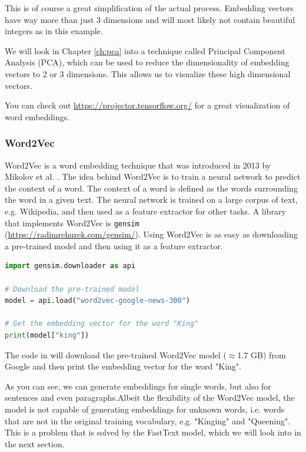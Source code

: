 This is of course a great simplification of the actual process. Embedding vectors have way more than just 3 dimensions and will most likely not contain beautiful integers as in this example.

We will look in Chapter \ref{ch:pca} into a technique called Principal Component Analysis (PCA), which can be used to reduce the dimensionality of embedding vectors to 2 or 3 dimensions. 
This allows us to visualize these high dimensional vectors.

You can check out \url{https://projector.tensorflow.org/} for a great visualization of word embeddings.

\subsubsection{Word2Vec}
Word2Vec is a word embedding technique that was introduced in 2013 by Mikolov et al. \cite{mikolov2013efficient}.
The idea behind Word2Vec is to train a neural network to predict the context of a word.
The context of a word is defined as the words surrounding the word in a given text.
The neural network is trained on a large corpus of text, e.g. Wikipedia, and then used as a feature extractor for other tasks.
A library that implements Word2Vec is \lstinline{gensim} \\(\url{https://radimrehurek.com/gensim/}).
Using Word2Vec is as easy as downloading a pre-trained model and then using it as a feature extractor.
\begin{lstlisting}[language=Python, caption={Word2Vec example}, label={code:word2vec}]
import gensim.downloader as api

# Download the pre-trained model
model = api.load("word2vec-google-news-300")

# Get the embedding vector for the word "King"
print(model["king"])
\end{lstlisting}
The code in  will download the pre-trained Word2Vec model ($\approx$1.7 GB) from Google and then print the embedding vector for the word "King".

As you can see, we can generate embeddings for single words, but also for sentences and even paragraphs.Albeit the flexibility of the Word2Vec model, the model is not capable of generating embeddings for unknown words, i.e. words that are not in the original training vocabulary, e.g. "Kinging" and "Queening". 
This is a problem that is solved by the FastText model, which we will look into in the next section.

